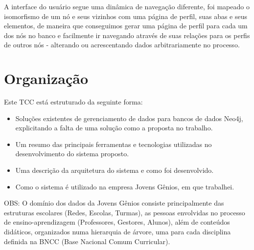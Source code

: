 A interface do usuário segue uma dinâmica de navegação diferente, foi mapeado o isomorfismo de um nó e seus vizinhos com uma página de perfil, suas abas e seus elementos, de maneira que conseguimos gerar uma página de perfil para cada um dos nós no banco e facilmente ir navegando através de suas relações para os perfis de outros nós - alterando ou acrescentando dados arbitrariamente no processo.

\section{Organização}

Este TCC está estruturado da seguinte forma:
\begin{itemize}
  \item Soluções existentes de gerenciamento de dados para bancos de dados Neo4j, explicitando a falta de uma solução como a proposta no trabalho.
  \item Um resumo das principais ferramentas e tecnologias utilizadas no desenvolvimento do sistema proposto.
  \item Uma descrição da arquitetura do sistema e como foi desenvolvido.
  \item Como o sistema é utilizado na empresa Jovens Gênios, em que trabalhei.
\end{itemize}

OBS: O domínio dos dados da Jovens Gênios consiste principalmente das estruturas escolares (Redes, Escolas, Turmas), as pessoas envolvidas no processo de ensino-aprendizagem (Professores, Gestores, Alunos), além de conteúdos didáticos, organizados numa hierarquia de árvore, uma para cada disciplina definida na BNCC (Base Nacional Comum Curricular).
